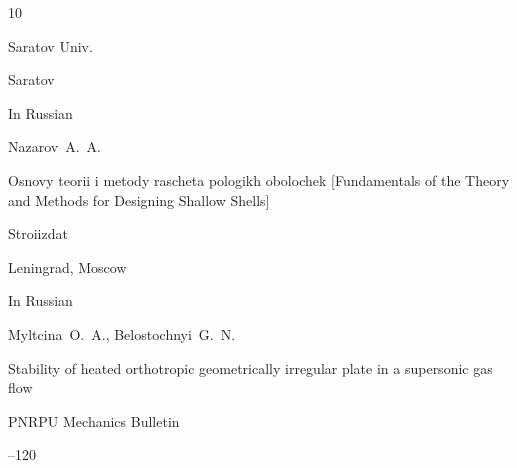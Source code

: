 \begin{thebibliography}{10}

\publ Saratov Univ.

\publaddr Saratov


 






\lang In Russian

\by Nazarov~A.~A.

\book Osnovy teorii i metody rascheta pologikh obolochek \rm [Fundamentals of the Theory and Methods for Designing Shallow Shells]


\publ  Stroiizdat

\publaddr Leningrad, Moscow







\lang In Russian

\by Myltcina~O.~A., Belostochnyi~G.~N.

\paper Stability of heated orthotropic geometrically irregular plate in a supersonic gas flow

\jour PNRPU Mechanics Bulletin



--120






\end{thebibliography}







%

